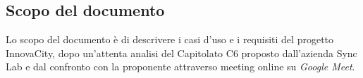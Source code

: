 \subsection{Scopo del documento}
Lo scopo del documento è di descrivere i casi d'uso e i requisiti del progetto InnovaCity, dopo un'attenta analisi del Capitolato C6 proposto dall'azienda Sync Lab e dal confronto con la proponente attraverso meeting online su \textit{Google Meet}. 